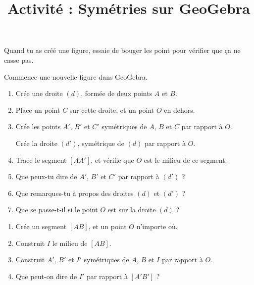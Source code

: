 \documentclass[a4paper,12pt]{article}
\title{Activité : Symétries sur GeoGebra}
\date{}
\author{}
\makeatletter
\renewcommand{\maketitle}{%
	\begin{center}
		\LARGE
		\myuline{\@title}
		\vspace{1em}
	\end{center}
}
\makeatother
\begin{document}
\maketitle

\begin{attention}
	Quand tu as créé une figure, essaie de bouger les point pour vérifier que ça ne casse pas.
\end{attention}

\begin{exercice}
	Commence une nouvelle figure dans GeoGebra.
	\begin{enumerate}
		\item Crée une droite $(d)$, formée de deux points $A$ et $B$.
		\item Place un point $C$ sur cette droite, et un point $O$ en dehors.
		\item Crée les points $A'$, $B'$ et $C'$ symétriques de $A$, $B$ et $C$ par rapport à $O$.

		      Crée la droite $(d')$, symétrique de $(d)$ par rapport à $O$.
		\item Trace le segment $[AA']$, et vérifie que $O$ est le milieu de ce segment. \vspace{2em}
		\item Que peux-tu dire de $A'$, $B'$ et $C'$ par rapport à $(d')$ ? \vspace{2em}
		\item Que remarques-tu à propos des droites $(d)$ et $(d')$ ? \vspace{2em}
		\item Que se passe-t-il si le point $O$ est sur la droite $(d)$ ? \vspace{2em}
	\end{enumerate}
\end{exercice}

\begin{exercice}
	\begin{enumerate}
		\item Crée un segment $[AB]$, et un point $O$ n'importe où.
		\item Construit $I$ le milieu de $[AB]$.
		\item Construit $A'$, $B'$ et $I'$ symétriques de $A$, $B$ et $I$ par rapport à $O$.
		\item Que peut-on dire de $I'$ par rapport à $[A'B']$ ? \vspace{2em}
	\end{enumerate}
\end{exercice}
\end{document}

